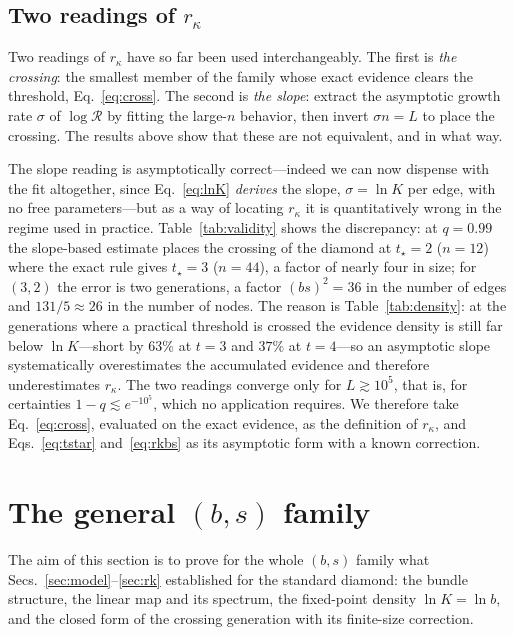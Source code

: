 \documentclass[preprint,12pt]{elsarticle}
\newcommand{\Rev}{\mathcal{R}}
\newcommand{\logR}{\log \Rev}
\newcommand{\rk}{r_{\kappa}}
\begin{document}
\subsection{Two readings of $\rk$}
\label{sec:tworeadings}

Two readings of $\rk$ have so far been used interchangeably. The first is \emph{the crossing}: the smallest
member of the family whose exact evidence clears the threshold,
Eq.~\eqref{eq:cross}. The second is \emph{the slope}: extract the asymptotic
growth rate $\sigma$ of $\logR$ by fitting the large-$n$ behavior, then invert
$\sigma n=L$ to place the crossing. The results above show that these are not
equivalent, and in what way.

The slope reading is asymptotically correct---indeed we can now dispense with
the fit altogether, since Eq.~\eqref{eq:lnK} \emph{derives} the slope,
$\sigma=\ln K$ per edge, with no free parameters---but as a way of locating
$\rk$ it is quantitatively wrong in the regime used in practice.
Table~\ref{tab:validity} shows the discrepancy: at $q=0.99$ the slope-based
estimate places the crossing of the diamond at $t_\star=2$ ($n=12$) where the
exact rule gives $t_\star=3$ ($n=44$), a factor of nearly four in size; for
$(3,2)$ the error is two generations, a factor $(bs)^2=36$ in the number of
edges and $131/5\approx26$ in the number of nodes. The reason is
Table~\ref{tab:density}: at the generations where a practical threshold is
crossed the evidence density is still far below $\ln K$---short by $63\%$ at
$t=3$ and $37\%$ at $t=4$---so an asymptotic slope systematically overestimates
the accumulated evidence and therefore underestimates $\rk$. The two readings converge only for
$L\gtrsim10^5$, that is, for certainties $1-q\lesssim e^{-10^5}$, which no
application requires. We therefore take Eq.~\eqref{eq:cross}, evaluated on the
exact evidence, as the definition of $\rk$, and Eqs.~\eqref{eq:tstar}
and~\eqref{eq:rkbs} as its asymptotic form with a known correction.

\section{The general \texorpdfstring{$(b,s)$}{(b,s)} family}
\label{sec:general}

The aim of this section is to prove for the whole $(b,s)$ family what
Secs.~\ref{sec:model}--\ref{sec:rk} established for the standard diamond: the
bundle structure, the linear map and its spectrum, the fixed-point density
$\ln K=\ln b$, and the closed form of the crossing generation with its
finite-size correction.
\end{document}
